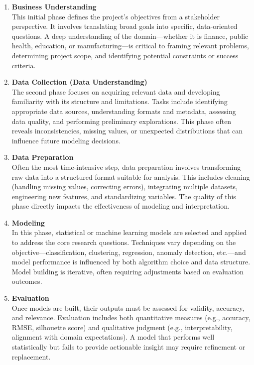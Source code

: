 \begin{enumerate}
    \item \textbf{Business Understanding} \\
    This initial phase defines the project’s objectives from a stakeholder perspective. It involves translating broad goals into specific, data-oriented questions. A deep understanding of the domain—whether it is finance, public health, education, or manufacturing—is critical to framing relevant problems, determining project scope, and identifying potential constraints or success criteria.

    \item \textbf{Data Collection (Data Understanding)} \\
    The second phase focuses on acquiring relevant data and developing familiarity with its structure and limitations. Tasks include identifying appropriate data sources, understanding formats and metadata, assessing data quality, and performing preliminary explorations. This phase often reveals inconsistencies, missing values, or unexpected distributions that can influence future modeling decisions.

    \item \textbf{Data Preparation} \\
    Often the most time-intensive step, data preparation involves transforming raw data into a structured format suitable for analysis. This includes cleaning (handling missing values, correcting errors), integrating multiple datasets, engineering new features, and standardizing variables. The quality of this phase directly impacts the effectiveness of modeling and interpretation.

    \item \textbf{Modeling} \\
    In this phase, statistical or machine learning models are selected and applied to address the core research questions. Techniques vary depending on the objective—classification, clustering, regression, anomaly detection, etc.—and model performance is influenced by both algorithm choice and data structure. Model building is iterative, often requiring adjustments based on evaluation outcomes.

    \item \textbf{Evaluation} \\
    Once models are built, their outputs must be assessed for validity, accuracy, and relevance. Evaluation includes both quantitative measures (e.g., accuracy, RMSE, silhouette score) and qualitative judgment (e.g., interpretability, alignment with domain expectations). A model that performs well statistically but fails to provide actionable insight may require refinement or replacement.


\end{enumerate}
